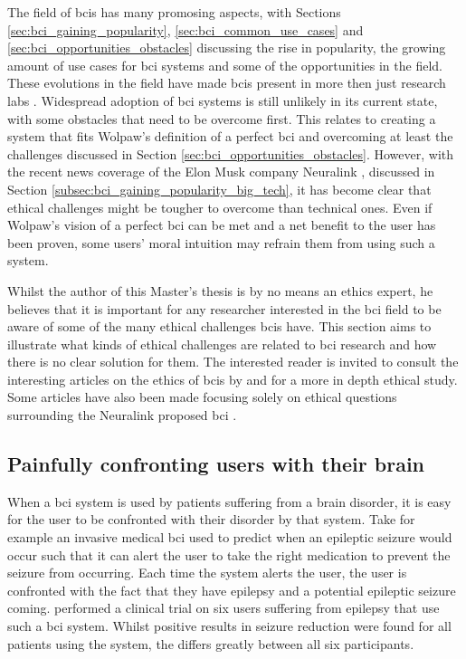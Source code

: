The field of \glspl{bci} has many promosing aspects, with Sections \ref{sec:bci_gaining_popularity}, \ref{sec:bci_common_use_cases} and \ref{sec:bci_opportunities_obstacles} discussing the rise in popularity, the growing amount of use cases for \gls{bci} systems and some of the opportunities in the field.
These evolutions in the field have made \glspl{bci} present in more then just research labs \citep{ethical_dillemas,bci_applications}.
Widespread adoption of \gls{bci} systems is still unlikely in its current state, with some obstacles that need to be overcome first.
This relates to creating a system that fits Wolpaw's definition of a perfect \gls{bci} and overcoming at least the challenges discussed in Section \ref{sec:bci_opportunities_obstacles}.
However, with the recent news coverage of the Elon Musk company Neuralink \citep{neuralink_whitepaper}, discussed in Section \ref{subsec:bci_gaining_popularity_big_tech}, it has become clear that ethical challenges might be tougher to overcome than technical ones.
Even if Wolpaw's vision of a perfect \gls{bci} can be met and a net benefit to the user has been proven, some users' moral intuition may refrain them from using such a system.

Whilst the author of this Master's thesis is by no means an ethics expert, he believes that it is important for any researcher interested in the \gls{bci} field to be aware of some of the many ethical challenges \glspl{bci} have.
This section aims to illustrate what kinds of ethical challenges are related to \gls{bci} research and how there is no clear solution for them.
The interested reader is invited to consult the interesting articles on the ethics of \glspl{bci} by \citet{ethics_of_bci} and \citet{ethical_dillemas} for a more in depth ethical study.
Some articles have also been made focusing solely on ethical questions surrounding the Neuralink proposed \gls{bci} \citep{neuralink_ethics,neuralink_ethics2}.


\subsection{Painfully confronting users with their brain}
\label{subsec:bci_ethical_confronting}

When a \gls{bci} system is used by patients suffering from a brain disorder, it is easy for the user to be confronted with their disorder by that system.
Take for example an invasive medical \gls{bci} used to predict when an epileptic seizure would occur such that it can alert the user to take the right medication to prevent the seizure from occurring.
Each time the system alerts the user, the user is confronted with the fact that they have epilepsy and a potential epileptic seizure coming.
 performed a clinical trial on six users suffering from epilepsy that use such a \gls{bci} system.
Whilst positive results in seizure reduction were found for all patients using the system, the  differs greatly between all six participants.

